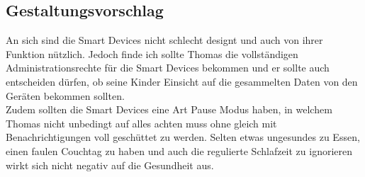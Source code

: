 \subsection{Gestaltungsvorschlag}
An sich sind die Smart Devices nicht schlecht designt und auch von ihrer Funktion nützlich. Jedoch finde ich sollte Thomas die vollständigen Administrationsrechte für die Smart Devices bekommen und er sollte auch entscheiden dürfen, ob seine Kinder Einsicht auf die gesammelten Daten von den Geräten bekommen sollten. \\
Zudem sollten die Smart Devices eine Art Pause Modus haben, in welchem Thomas nicht unbedingt auf alles achten muss ohne gleich mit Benachrichtigungen voll geschüttet zu werden. Selten etwas ungesundes zu Essen, einen faulen Couchtag zu haben und auch die regulierte Schlafzeit zu ignorieren wirkt sich nicht negativ auf die Gesundheit aus. 

